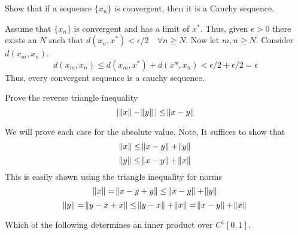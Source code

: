 \documentclass{homework}
\begin{document}
\begin{problem}[2-22]
  Show that if a sequence $\{x_n\}$ is convergent, then it is a Cauchy sequence.
\end{problem}

\begin{solution}
  Assume that $\{x_n\}$ is convergent and has a limit of $x^*$. Thus, given $\epsilon > 0$ there exists an $N$ such that $d(x_n, x^*) < \epsilon/2 \quad \forall n \geq N$. Now let $m,n \geq N$. Consider $d(x_m, x_n)$.
  \[d(x_m, x_n) \leq d(x_m, x^*) + d(x*,x_n) < \epsilon/2 + \epsilon/2 = \epsilon\]
Thus, every convergent sequence is a cauchy sequence.
\end{solution}

\begin{problem}[2-33]
  Prove the reverse triangle inequality
  \[|\norm{x} - \norm{y}| \leq \norm{x-y}\]
\end{problem}

\begin{solution}
  We will prove each case for the absolute value. Note, It suffices to show that 
  \[\norm{x} \leq \norm{x - y} + \norm{y}\]
  \[\norm{y} \leq \norm{x - y} + \norm{x}\]
  This is easily shown using the triangle inequality for norms
  \[\norm{x} = \norm{x - y + y} \leq \norm{x - y} + \norm{y}\]
  \[\norm{y} = \norm{y - x + x} \leq \norm{y - x} + \norm{x} = \norm{x - y} + \norm{x}\]
\end{solution}

\begin{problem}[2-42]
  Which of the following determines an inner product over $C^1[0,1]$.
  \begin{parts}
    \part
    \[\langle f, g \rangle = \int_0^1 f'(t)g'(t)\ dt + f(0)g(0)\]
    \part
    \[\langle f, g \rangle = \int_0^1 f'(t)g'(t)\ dt\]
  \end{parts}
\end{problem}
\end{document}
